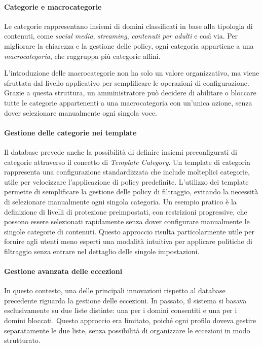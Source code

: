 \paragraph{Categorie e macrocategorie}
Le categorie rappresentano insiemi di domini classificati in base alla tipologia di contenuti, come \emph{social media}, \emph{streaming}, \emph{contenuti per adulti} e così via. Per migliorare la chiarezza e la gestione delle policy, ogni categoria appartiene a una \emph{macrocategoria}, che raggruppa più categorie affini.

L'introduzione delle macrocategorie non ha solo un valore organizzativo, ma viene sfruttata dal livello applicativo per semplificare le operazioni di configurazione. Grazie a questa struttura, un amministratore può decidere di abilitare o bloccare tutte le categorie appartenenti a una macrocategoria con un'unica azione, senza dover selezionare manualmente ogni singola voce.

\paragraph{Gestione delle categorie nei template}
Il database prevede anche la possibilità di definire insiemi preconfigurati di categorie attraverso il concetto di \emph{Template Category}. Un template di categoria rappresenta una configurazione standardizzata che include molteplici categorie, utile per velocizzare l’applicazione di policy predefinite.
%
L’utilizzo dei template permette di semplificare la gestione delle policy di filtraggio, evitando la necessità di selezionare manualmente ogni singola categoria. Un esempio pratico è la definizione di livelli di protezione preimpostati, con restrizioni progressive, che possono essere selezionati rapidamente senza dover configurare manualmente le singole categorie di contenuti. Questo approccio risulta particolarmente utile per fornire agli utenti meno esperti una modalità intuitiva per applicare politiche di filtraggio senza entrare nel dettaglio delle singole impostazioni.

\paragraph{Gestione avanzata delle eccezioni}
In questo contesto, una delle principali innovazioni rispetto al database precedente riguarda la gestione delle eccezioni. In passato, il sistema si basava esclusivamente su due liste distinte: una per i domini consentiti e una per i domini bloccati. Questo approccio era limitato, poiché ogni profilo doveva gestire separatamente le due liste, senza possibilità di organizzare le eccezioni in modo strutturato.

